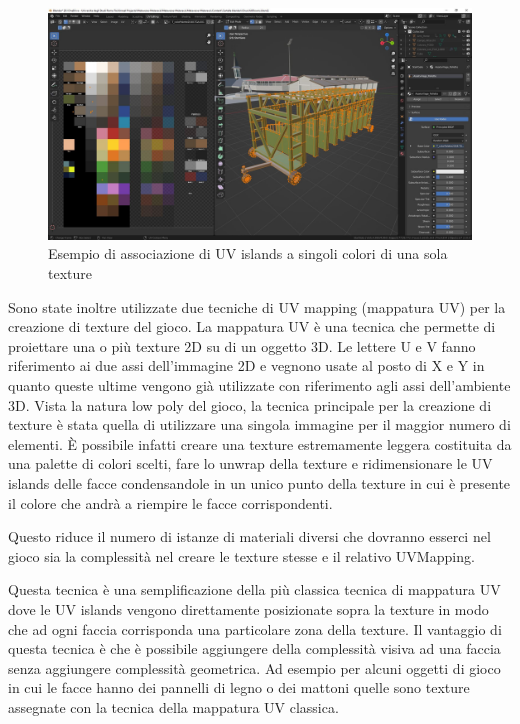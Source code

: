     \begin{figure}[b]
        \centering
        \includegraphics[width=.9\textwidth]{figure/BlenderLowPolyTexturing.JPG}
        \caption{Esempio di associazione di UV islands a singoli colori di una sola texture}
    \end{figure}

    Sono state inoltre utilizzate due tecniche di UV mapping (mappatura UV) per la creazione di texture del gioco.
    La mappatura UV è una tecnica che permette di proiettare una o più texture 2D su di un oggetto 3D.
    Le lettere U e V fanno riferimento ai due assi dell'immagine 2D e vegnono usate al posto di X e Y in quanto queste ultime vengono già utilizzate con riferimento agli assi dell'ambiente 3D.
    Vista la natura low poly del gioco, la tecnica principale per la creazione di texture è stata quella di utilizzare una singola immagine per il maggior numero di elementi.
    È possibile infatti creare una texture estremamente leggera costituita da una palette di colori scelti, fare lo unwrap della texture e ridimensionare le UV islands delle facce condensandole in un unico punto della texture in cui è presente il colore che andrà a riempire le facce corrispondenti.

    
    
    Questo riduce il numero di istanze di materiali diversi che dovranno esserci nel gioco sia la complessità nel creare le texture stesse e il relativo UVMapping.

    Questa tecnica è una semplificazione della più classica tecnica di mappatura UV dove le UV islands vengono direttamente posizionate sopra la texture in modo che ad ogni faccia corrisponda una particolare zona della texture.
    Il vantaggio di questa tecnica è che è possibile aggiungere della complessità visiva ad una faccia senza aggiungere complessità geometrica.
    Ad esempio per alcuni oggetti di gioco in cui le facce hanno dei pannelli di legno o dei mattoni quelle sono texture assegnate con la tecnica della mappatura UV classica.

